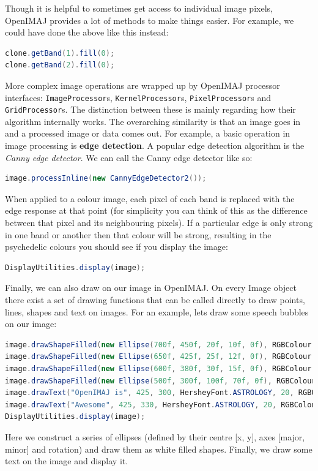 \documentclass[10pt,a4paper,twoside,extrafontsizes]{memoir}
\begin{document}
Though it is helpful to sometimes get access to individual image pixels, OpenIMAJ provides a lot 
of methods to make things easier. For example, we could have done the above like this instead:
\begin{lstlisting}[language=java]
clone.getBand(1).fill(0);
clone.getBand(2).fill(0);
\end{lstlisting}

More complex image operations are wrapped up by OpenIMAJ processor interfaces: \verb+ImageProcessor+s, \verb+KernelProcessor+s,
\verb+PixelProcessor+s and \verb+GridProcessor+s. The distinction between these is mainly 
regarding how their algorithm internally works. The overarching similarity is that an image goes 
in and a processed image or data comes out. For example, a basic operation in image processing 
is \textbf{edge detection}. A popular edge detection algorithm is the \emph{Canny edge detector}. 
We can call the Canny edge detector like so:
\begin{lstlisting}[language=java]
image.processInline(new CannyEdgeDetector2());
\end{lstlisting}
When applied to a colour image, each pixel of each band is replaced with the edge response at 
that point (for simplicity you can think of this as the difference between that pixel and its 
neighbouring pixels). If a particular edge is only strong in one band or another then that 
colour will be strong, resulting in the psychedelic colours you should see if you display 
the image:
\begin{lstlisting}[language=java]
DisplayUtilities.display(image);
\end{lstlisting}

Finally, we can also draw on our image in OpenIMAJ. On every Image object there exist a 
set of drawing functions that can be called directly to draw points, lines, shapes and text on 
images. For an example, lets draw some speech bubbles on our image:
\begin{lstlisting}[language=java]
image.drawShapeFilled(new Ellipse(700f, 450f, 20f, 10f, 0f), RGBColour.WHITE);
image.drawShapeFilled(new Ellipse(650f, 425f, 25f, 12f, 0f), RGBColour.WHITE);
image.drawShapeFilled(new Ellipse(600f, 380f, 30f, 15f, 0f), RGBColour.WHITE);
image.drawShapeFilled(new Ellipse(500f, 300f, 100f, 70f, 0f), RGBColour.WHITE);
image.drawText("OpenIMAJ is", 425, 300, HersheyFont.ASTROLOGY, 20, RGBColour.BLACK);
image.drawText("Awesome", 425, 330, HersheyFont.ASTROLOGY, 20, RGBColour.BLACK);
DisplayUtilities.display(image);
\end{lstlisting}
Here we construct a series of ellipses (defined by their centre [x, y], axes 
[major, minor] and rotation) and draw them as white filled shapes. Finally, we draw 
some text on the image and display it.
\end{document}
